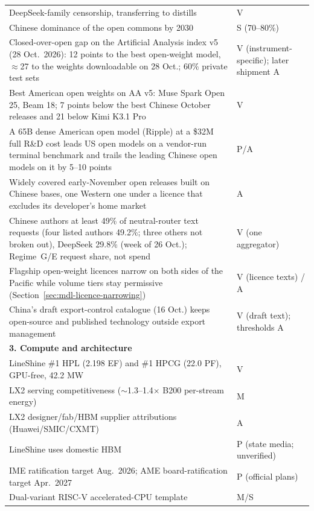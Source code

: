 \begin{small}
\begin{longtable}{p{100mm}p{36mm}}
  DeepSeek-family censorship, transferring to distills & V \\
  Chinese dominance of the open commons by 2030 & S (70--80\%) \\
  \midrule
  Closed-over-open gap on the Artificial Analysis index v5 (28 Oct.\ 2026): 12 points to the best open-weight model, $\approx$27 to the weights downloadable on 28 Oct.; 60\% private test sets & V (instrument-specific); later shipment A \\
  Best American open weights on AA v5: Muse Spark Open 25, Beam 18; 7 points below the best Chinese October releases and 21 below Kimi K3.1 Pro & V \\
  A 65B dense American open model (Ripple) at a \$32M full R\&D cost leads US open models on a vendor-run terminal benchmark and trails the leading Chinese open models on it by 5--10 points & P/A \\
  Widely covered early-November open releases built on Chinese bases, one Western one under a licence that excludes its developer's home market & A \\
  Chinese authors at least 49\% of neutral-router text requests (four listed authors 49.2\%; three others not broken out), DeepSeek 29.8\% (week of 26 Oct.); Regime~G/E request share, not spend & V (one aggregator) \\
  Flagship open-weight licences narrow on both sides of the Pacific while volume tiers stay permissive (Section~\ref{sec:mdl-licence-narrowing}) & V (licence texts) / A \\
  China's draft export-control catalogue (16 Oct.) keeps open-source and published technology outside export management & V (draft text); thresholds A \\
  \midrule
  \multicolumn{2}{l}{\textbf{3. Compute and architecture}} \\
  \midrule
  LineShine \#1 HPL (2.198 EF) and \#1 HPCG (22.0 PF), GPU-free, 42.2 MW & V \\
  LX2 serving competitiveness ($\sim$1.3--1.4$\times$ B200 per-stream energy) & M \\
  LX2 designer/fab/HBM supplier attributions (Huawei/SMIC/CXMT) & A \\
  LineShine uses domestic HBM & P (state media; unverified) \\
  IME ratification target Aug.\ 2026; AME board-ratification target Apr.\ 2027 & P (official plans) \\
  Dual-variant RISC-V accelerated-CPU template & M/S \\

\end{longtable}
\end{small}
